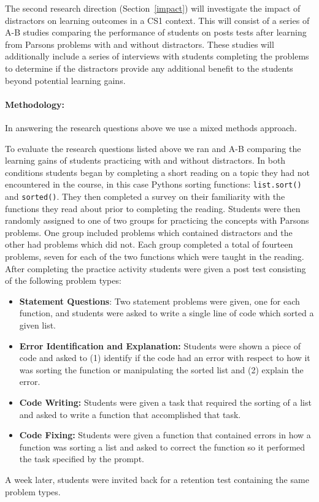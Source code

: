 \documentclass[authorversion,nonacm]{acmart}
\begin{document}
The second research direction (Section~\ref{impact}) will investigate the impact
of distractors on learning outcomes in a CS1 context. This will consist of a
series of A-B studies comparing the performance of students on posts tests after
learning from Parsons problems with and without distractors. These studies will
additionally include a series of interviews with students completing the
problems to determine if the distractors provide any additional benefit to the
students beyond potential learning gains. 

\paragraph{Methodology:} In answering the research questions above we use a
mixed methods approach. \textcolor{red}{}

To evaluate the research questions listed above we ran and A-B comparing the
learning gains of students practicing with and without distractors.  In both
conditions students began by completing a short reading on a topic they had not
encountered in the course, in this case Pythons sorting functions:
\texttt{list.sort()} and \texttt{sorted()}.  They then completed a survey on
their familiarity with the functions they read about prior to completing the
reading.  Students were then randomly assigned to one of two groups for
practicing the concepts with Parsons problems. One group included problems
which contained distractors and the other had problems which did not.  Each
group completed a total of fourteen problems, seven for each of the two
functions which were taught in the reading. After completing the practice
activity students were given a post test consisting of the following problem
types:
\begin{itemize}
  \item \textbf{Statement Questions}: Two statement problems were given, one for each function, and students were asked to write a single line of code which sorted a given list.
  \item \textbf{Error Identification and Explanation:} Students were shown a piece of code and asked to (1) identify if the code had an error with respect to how it was sorting the function or manipulating the sorted list and (2) explain the error.
  \item \textbf{Code Writing:} Students were given a task that required the sorting of a list and asked to write a function that accomplished that task.
  \item \textbf{Code Fixing:} Students were given a function that contained errors in how a function was sorting a list and asked to correct the function so it performed the task specified by the prompt.
\end{itemize}
A week later, students were invited back for a retention test containing the
same problem types.
\end{document}
